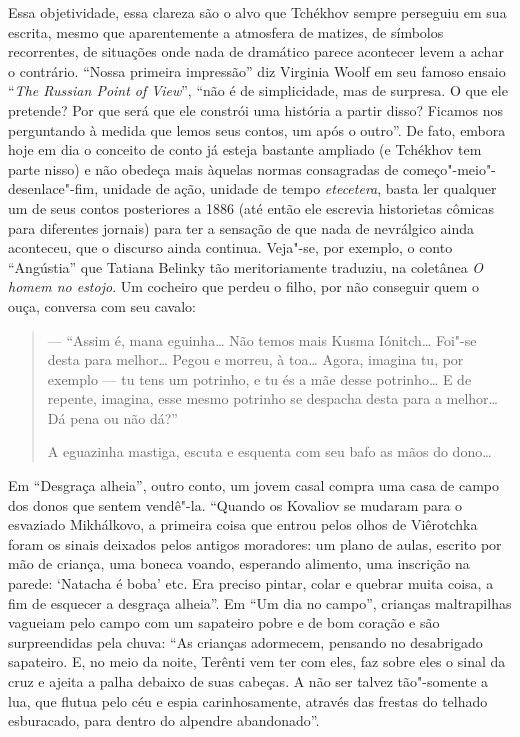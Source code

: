 Essa objetividade, essa clareza são o alvo que Tchékhov sempre perseguiu
em sua escrita, mesmo que aparentemente a atmosfera de matizes, de
símbolos recorrentes, de situações onde nada de dramático parece
acontecer levem a achar o contrário. ``Nossa primeira impressão'' diz
Virginia Woolf em seu famoso ensaio ``\emph{The Russian Point of
View}'', ``não é de simplicidade, mas de surpresa. O que ele pretende? Por
que será que ele constrói uma história a partir disso? Ficamos nos
perguntando à medida que lemos seus contos, um após o outro''. De fato,
embora hoje em dia o conceito de conto já esteja bastante ampliado (e
Tchékhov tem parte nisso) e não obedeça mais àquelas normas consagradas
de começo"-meio"-desenlace"-fim, unidade de ação, unidade de tempo
\emph{etecetera}, basta ler qualquer um de seus contos posteriores a 1886 (até
então ele escrevia historietas cômicas para diferentes jornais) para ter
a sensação de que nada de nevrálgico ainda aconteceu, que o discurso
ainda continua. Veja"-se, por exemplo, o conto ``Angústia'' que Tatiana
Belinky tão meritoriamente traduziu, na coletânea \emph{O homem no
estojo}. Um cocheiro que perdeu o filho, por não conseguir quem o ouça, conversa com seu cavalo:

\begin{quote}
--- ``Assim é, mana eguinha\ldots{} Não
temos mais Kusma Iónitch\ldots{} Foi"-se desta para melhor\ldots{} Pegou e morreu,
à toa\ldots{} Agora, imagina tu, por exemplo --- tu tens um potrinho, e tu és
a mãe desse potrinho\ldots{} E de repente, imagina, esse mesmo potrinho se
despacha desta para a melhor\ldots{} Dá pena ou não dá?''

A eguazinha mastiga, escuta e esquenta com seu bafo as mãos do dono\ldots{}
\end{quote}


Em ``Desgraça alheia'', outro conto, um jovem casal compra uma casa
de campo dos donos que sentem vendê"-la. ``Quando os Kovaliov se mudaram
para o esvaziado Mikhálkovo, a primeira coisa que entrou pelos olhos de
Viêrotchka foram os sinais deixados pelos antigos moradores: um plano de
aulas, escrito por mão de criança, uma boneca voando, esperando
alimento, uma inscrição na parede: `Natacha é boba' etc. Era preciso pintar, colar e quebrar muita coisa, a fim de esquecer a
desgraça alheia''. Em ``Um dia no campo'', crianças maltrapilhas
vagueiam pelo campo com um sapateiro pobre e de bom coração e são
surpreendidas pela chuva: ``As crianças adormecem, pensando no
desabrigado sapateiro. E, no meio da noite, Terênti vem ter com eles,
faz sobre eles o sinal da cruz e ajeita a palha debaixo de suas cabeças.
A não ser talvez tão"-somente a lua, que flutua pelo céu e espia
carinhosamente, através das frestas do telhado esburacado, para dentro
do alpendre abandonado''.

